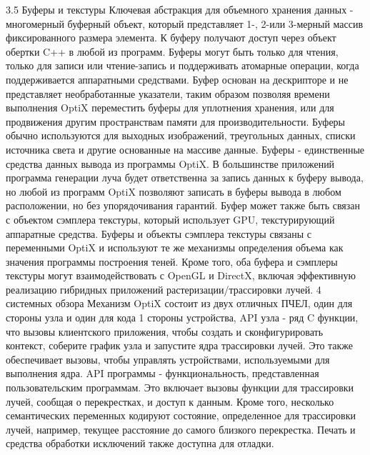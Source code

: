 3.5 Буферы и текстуры
Ключевая абстракция для объемного хранения данных - многомерный буферный объект, который представляет 1-, 2-или 3-мерный массив фиксированного размера элемента. К буферу получают доступ через объект обертки C++ в любой из программ. Буферы могут быть только для чтения, только для записи или чтение-запись и поддерживать атомарные операции, когда поддерживается аппаратными средствами. Буфер основан на дескрипторе и не представляет необработанные указатели, таким образом позволяя времени выполнения OptiX переместить буферы для уплотнения хранения, или для продвижения другим пространствам памяти для производительности.
Буферы обычно используются для выходных изображений, треугольных данных,
списки источника света и другие основанные на массиве данные. Буферы - единственные средства данных вывода из программы OptiX. В большинстве приложений программа генерации луча будет ответственна за запись данных к буферу вывода, но любой из программ OptiX позволяют записать в буферы вывода в любом расположении, но без упорядочивания гарантий.
Буфер может также быть связан с объектом сэмплера текстуры, который использует GPU, текстурирующий аппаратные средства. Буферы и объекты сэмплера текстуры связаны с переменными OptiX и используют те же механизмы определения объема как значения программы построения теней. Кроме того, оба буфера и сэмплеры текстуры могут взаимодействовать с OpenGL и DirectX, включая эффективную реализацию гибридных приложений растеризации/трассировки лучей.
4 системных обзора
Механизм OptiX состоит из двух отличных ПЧЕЛ, один для стороны узла и один для кода 1 стороны устройства, API узла - ряд C функции, что вызовы клиентского приложения, чтобы создать и сконфигурировать контекст, соберите график узла и запустите ядра трассировки лучей. Это также обеспечивает вызовы, чтобы управлять устройствами, используемыми для выполнения ядра. API программы - функциональность, представленная пользовательским программам. Это включает вызовы функции для трассировки лучей, сообщая о перекрестках, и
доступ к данным. Кроме того, несколько семантических переменных кодируют состояние, определенное для трассировки лучей, например, текущее расстояние до самого близкого перекрестка.
Печать и средства обработки исключений также доступна для отладки.
